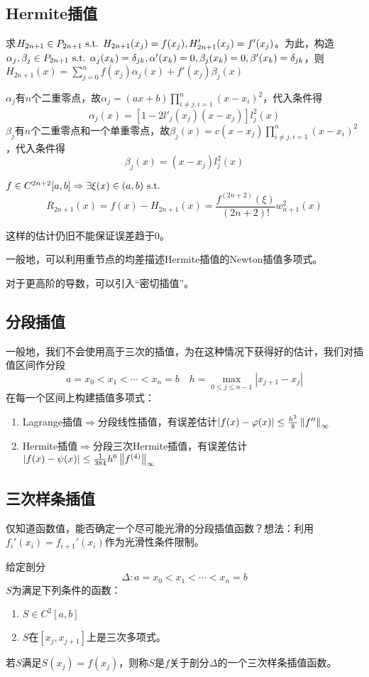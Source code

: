 \documentclass{ctexart}
\begin{document}
\subsection{Hermite插值}
求$H_{2n+1}\in P_{2n+1}\text{ s.t. } H_{2n+1}(x_j)=f(x_j),H_{2n+1}'(x_j)=f'(x_j)$。为此，构造$\alpha_j,\beta_j\in P_{2n+1}\text{ s.t. } \alpha_j(x_k)=\delta_{jk},\alpha'(x_k)=0,\beta_j(x_k)=0,\beta'(x_k)=\delta_{jk}$，则$H_{2n+1}(x)=\sum_{j=0}^n f(x_j)\alpha_j(x)+f'(x_j)\beta_j(x)$

$\alpha_j$有$n$个二重零点，故$\alpha_j=(ax+b)\prod\limits_{i\neq j,i=1}^{n}(x-x_i)^2$，代入条件得\[\alpha_j(x)=[1-2l'_j(x_j)(x-x_j)]l^2_j(x)\]$\beta_j$有$n$个二重零点和一个单重零点，故$\beta_j(x)=c(x-x_j)\prod\limits_{i\neq j,i=1}^{n}(x-x_i)^2$，代入条件得\[\beta_j(x)=(x-x_j)l_j^2(x)\]

\begin{Thm}
$f\in C^{2n+2}[a,b]\Rightarrow \exists \xi(x)\in (a,b)\text{ s.t. }$
\[R_{2n+1}(x)=f(x)-H_{2n+1}(x)=\frac{f^{(2n+2)}(\xi)}{(2n+2)!}w_{n+1}^2(x)\]
\end{Thm}
这样的估计仍旧不能保证误差趋于$0$。

一般地，可以利用重节点的均差描述Hermite插值的Newton插值多项式。

对于更高阶的导数，可以引入“密切插值”。

\subsection{分段插值}
一般地，我们不会使用高于三次的插值，为在这种情况下获得好的估计，我们对插值区间作分段
\[a=x_0<x_1<\cdots <x_n=b\quad h=\max_{0\leq j\leq n-1}|x_{j+1}-x_j|\]
在每一个区间上构建插值多项式：
\begin{enumerate}
	\item Lagrange插值$\Rightarrow $分段线性插值，有误差估计$|f(x)-\varphi(x)|\leq \frac{h^2}{8}\left\|f'' \right\|_\infty$
	\item Hermite插值$\Rightarrow $分段三次Hermite插值，有误差估计$|f(x)-\psi(x)|\leq \frac{1}{384}h^6\left\|f^{(4)} \right\|_\infty$
\end{enumerate}

\subsection{三次样条插值}
仅知道函数值，能否确定一个尽可能光滑的分段插值函数？想法：利用$f_i'(x_i)=f_{i+1}'(x_i)$作为光滑性条件限制。
\begin{Def}
给定剖分
\[\Delta:a=x_0<x_1<\cdots<x_n=b\]
$S$为满足下列条件的函数：
\begin{enumerate}
	\item $S\in C^2[a,b]$
	\item $S$在$[x_j,x_{j+1}]$上是三次多项式。
\end{enumerate}	
若$S$满足$S(x_j)=f(x_j)$，则称$S$是$f$关于剖分$\Delta$的一个三次样条插值函数。
\end{Def}
\end{document}
